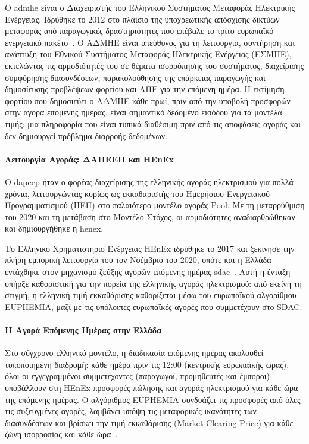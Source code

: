 Ο \gls{admhe} είναι ο
Διαχειριστής του Ελληνικού Συστήματος Μεταφοράς Ηλεκτρικής Ενέργειας. Ιδρύθηκε το
2012 στο πλαίσιο της υποχρεωτικής απόσχισης δικτύων μεταφοράς από παραγωγικές
δραστηριότητες που επέβαλε το τρίτο ευρωπαϊκό ενεργειακό πακέτο~\cite{ipto_balancing_market}.
Ο ΑΔΜΗΕ είναι υπεύθυνος για τη λειτουργία, συντήρηση και ανάπτυξη του Εθνικού
Συστήματος Μεταφοράς Ηλεκτρικής Ενέργειας (ΕΣΜΗΕ), εκτελώντας τις αρμοδιότητές του
σε θέματα ισορρόπησης του συστήματος, διαχείρισης συμφόρησης διασυνδέσεων,
παρακολούθησης της επάρκειας παραγωγής και δημοσίευσης προβλέψεων φορτίου και
ΑΠΕ για την επόμενη ημέρα. Η εκτίμηση φορτίου που δημοσιεύει ο ΑΔΜΗΕ κάθε πρωί,
πριν από την υποβολή προσφορών στην αγορά επόμενης ημέρας, είναι σημαντικό δεδομένο
εισόδου για τα μοντέλα τιμής: μια πληροφορία που είναι τυπικά διαθέσιμη πριν από
τις αποφάσεις αγοράς και δεν δημιουργεί πρόβλημα διαρροής δεδομένων.

\paragraph{Λειτουργία Αγοράς: ΔΑΠΕΕΠ και HEnEx}

Ο \gls{dapeep} ήταν ο φορέας διαχείρισης
της ελληνικής αγοράς ηλεκτρισμού για πολλά χρόνια, λειτουργώντας κυρίως ως εκκαθαριστής
του Ημερήσιου Ενεργειακού Προγραμματισμού (ΗΕΠ) στο παλαιότερο μοντέλο αγοράς Pool.
Με τη μεταρρύθμιση του 2020 και τη μετάβαση στο Μοντέλο Στόχος, οι αρμοδιότητες
αναδιαρθρώθηκαν και δημιουργήθηκε η \gls{henex}.

Το Ελληνικό Χρηματιστήριο Ενέργειας HEnEx ιδρύθηκε το 2017 και ξεκίνησε την πλήρη
εμπορική λειτουργία του τον Νοέμβριο του 2020, οπότε και η Ελλάδα εντάχθηκε στον
μηχανισμό ζεύξης αγορών επόμενης ημέρας \gls{sdac}~\cite{nemo_sdac}. Αυτή η ένταξη υπήρξε καθοριστική για την πορεία της ελληνικής αγοράς ηλεκτρισμού: από εκείνη τη στιγμή,
η ελληνική τιμή εκκαθάρισης καθορίζεται μέσω του ευρωπαϊκού αλγορίθμου EUPHEMIA,
μαζί με τις υπόλοιπες ευρωπαϊκές αγορές που συμμετέχουν στο SDAC.

\paragraph{Η Αγορά Επόμενης Ημέρας στην Ελλάδα}

Στο σύγχρονο ελληνικό μοντέλο, η διαδικασία επόμενης ημέρας ακολουθεί τυποποιημένη
διαδρομή: κάθε ημέρα πριν τις 12:00 (κεντρικής ευρωπαϊκής ώρας), όλοι οι εγγεγραμμένοι
συμμετέχοντες (παραγωγοί, προμηθευτές και έμποροι) υποβάλλουν στη HEnEx
προσφορές πώλησης και αγοράς ηλεκτρισμού για κάθε ώρα της επόμενης ημέρας. Ο αλγόριθμος
EUPHEMIA συνδυάζει τις προσφορές από όλες τις συζευγμένες αγορές, λαμβάνει υπόψη τις
μεταφορικές ικανότητες των διασυνδέσεων και βρίσκει την τιμή εκκαθάρισης (Market Clearing
Price) για κάθε ζώνη ισορροπίας και κάθε ώρα~\cite{nemo_sdac}.

